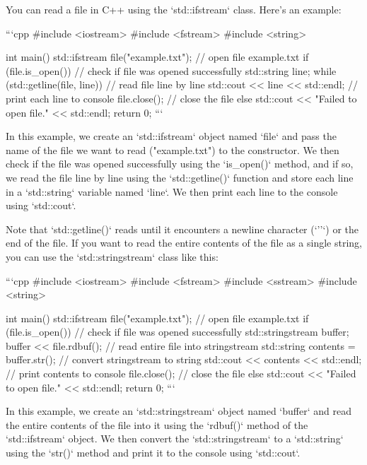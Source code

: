 You can read a file in C++ using the `std::ifstream` class. Here's an example:

```cpp
#include <iostream>
#include <fstream>
#include <string>

int main() {
    std::ifstream file("example.txt"); // open file example.txt
    if (file.is_open()) { // check if file was opened successfully
        std::string line;
        while (std::getline(file, line)) { // read file line by line
            std::cout << line << std::endl; // print each line to console
        }
        file.close(); // close the file
    }
    else {
        std::cout << "Failed to open file." << std::endl;
    }
    return 0;
}
```

In this example, we create an `std::ifstream` object named `file` and pass the name of the file we want to read ("example.txt") to the constructor. We then check if the file was opened successfully using the `is_open()` method, and if so, we read the file line by line using the `std::getline()` function and store each line in a `std::string` variable named `line`. We then print each line to the console using `std::cout`.

Note that `std::getline()` reads until it encounters a newline character (`'\n'`) or the end of the file. If you want to read the entire contents of the file as a single string, you can use the `std::stringstream` class like this:

```cpp
#include <iostream>
#include <fstream>
#include <sstream>
#include <string>

int main() {
    std::ifstream file("example.txt"); // open file example.txt
    if (file.is_open()) { // check if file was opened successfully
        std::stringstream buffer;
        buffer << file.rdbuf(); // read entire file into stringstream
        std::string contents = buffer.str(); // convert stringstream to string
        std::cout << contents << std::endl; // print contents to console
        file.close(); // close the file
    }
    else {
        std::cout << "Failed to open file." << std::endl;
    }
    return 0;
}
```

In this example, we create an `std::stringstream` object named `buffer` and read the entire contents of the file into it using the `rdbuf()` method of the `std::ifstream` object. We then convert the `std::stringstream` to a `std::string` using the `str()` method and print it to the console using `std::cout`.
